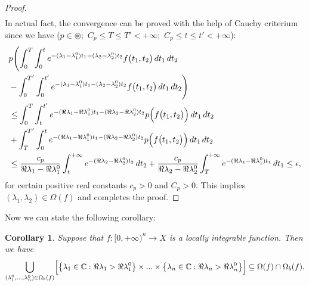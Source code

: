 \documentclass{amsart}
\newtheorem{cor}[thm]{Corollary}
\theoremstyle{definition}
\theoremstyle{remark}
\numberwithin{equation}{section}
\begin{document}
\begin{proof}
\begin{align*}
\end{align*} 
In actual fact, the convergence can be proved with the help of Cauchy criterium since we have ($p\in \circledast;$ $C_{p}\leq T\leq T'<+\infty;$ $C_{p}\leq t\leq t'<+\infty$):
\begin{align*}&
p\Biggl( \int^{T}_{0}\int^{t}_{0}e^{-(\lambda_{1}-\lambda_{1}^{0})t_{1}-(\lambda_{2}-\lambda_{2}^{0})t_{2}}f\bigl( t_{1},t_{2}\bigr)\, dt_{1}\, dt_{2}\\&-\int^{T'}_{0}\int^{t'}_{0}e^{-(\lambda_{1}-\lambda_{1}^{0})t_{1}-(\lambda_{2}-\lambda_{2}^{0})t_{2}}f\bigl( t_{1},t_{2}\bigr)\, dt_{1}\, dt_{2}\Biggr)
\\ & \leq \int^{T}_{0}\int^{t'}_{t}e^{-(\Re \lambda_{1}-\Re \lambda_{1}^{0})t_{1}-(\Re \lambda_{2}-\Re \lambda_{2}^{0})t_{2}}p\Bigl(f\bigl( t_{1},t_{2}\bigr)\Bigr)\, dt_{1}\, dt_{2}\\&+\int^{T'}_{T}\int^{t}_{0}e^{-(\Re \lambda_{1}-\Re \lambda_{1}^{0})t_{1}-(\Re \lambda_{2}-\Re \lambda_{2}^{0})t_{2}}p\Bigl(f\bigl( t_{1},t_{2}\bigr)\Bigr)\, dt_{1}\, dt_{2}
\\ & \leq \frac{c_{p}}{\Re \lambda_{1}-\Re \lambda_{1}^{0}}\int^{+\infty}_{t}e^{-(\Re \lambda_{2}-\Re \lambda_{2}^{0})t_{2}}\, dt_{2}+\frac{c_{p}}{\Re \lambda_{2}-\Re \lambda_{2}^{0}}\int^{+\infty}_{T}e^{-(\Re \lambda_{1}-\Re \lambda_{1}^{0})t_{1}}\, dt_{1}\leq \epsilon,
\end{align*}
for certain positive real constants $c_{p}>0$ and $C_{p}>0.$
This implies $(\lambda_{1},\lambda_{2})\in \Omega(f)$ and completes the proof. 
\end{proof}

Now we can state the following corollary:

\begin{cor}\label{dl121}
Suppose that $f: [0,+\infty)^{n}\rightarrow X$ is a locally integrable function. Then we have{\small
\begin{align*}
\bigcup_{(\lambda_{1}^{0},...,\lambda_{n}^{0})\in \Omega_{b}(f)}\Bigl[ \bigl\{ \lambda_{1}\in {\mathbb C} : \Re \lambda_{1}>\Re \lambda_{1}^{0}\bigr\} \times ... \times \bigl\{ \lambda_{n}\in {\mathbb C} : \Re \lambda_{n}>\Re \lambda_{n}^{0}\bigr\}\Bigr] \subseteq \Omega(f) \cap \Omega_{b}(f).
\end{align*}}
\end{cor}  
\end{document}
